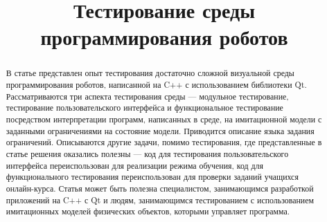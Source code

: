 \documentclass[conference]{IEEEtran}
\begin{document}
\title{Тестирование среды программирования роботов}

\author{
\and
}

\maketitle

\begin{abstract}
В статье представлен опыт тестирования достаточно сложной визуальной среды программирования роботов, 
написанной на C++ с использованием библиотеки Qt. Рассматриваются три аспекта тестирования среды --- 
модульное тестирование, тестирование пользовательского интерфейса и функциональное тестирование посредством 
интерпретации программ, написанных в среде, на имитационной модели с заданными ограничениями на состояние модели. 
Приводится описание языка задания ограничений. Описываются другие задачи, помимо тестирования, где представленные 
в статье решения оказались полезны --- код для тестирования пользовательского интерфейса переиспользован для 
реализации режима обучения, код для функционального тестирования переиспользован для проверки заданий учащихся 
онлайн-курса. Статья может быть полезна специалистом, занимающимся разработкой приложений на C++ с Qt и людям, 
занимающимся тестированием с использованием имитационных моделей физических объектов, которыми управляет программа.
\end{abstract}
\end{document}
